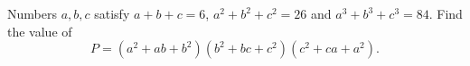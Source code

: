 Numbers $a,b,c$ satisfy $a+b+c=6$, $a^2+b^2+c^2=26$ and $a^3+b^3+c^3=84$. Find the value of
\[
P=\left(a^2+ab+b^2\right)\left(b^2+bc+c^2\right)\left(c^2+ca+a^2\right).
\]
